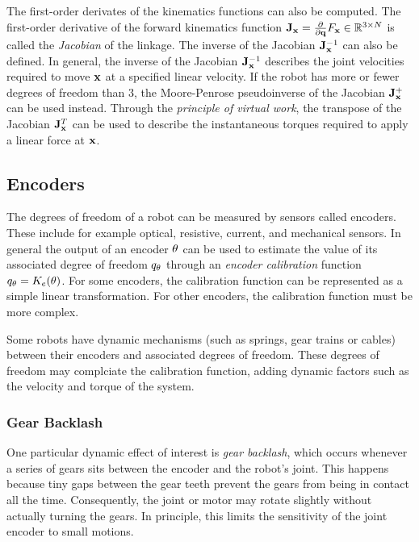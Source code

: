 The first-order derivates of the kinematics functions can also be computed. The first-order derivative of the forward kinematics function $\mathbf{J}_{\mathbf{x}} = \frac{\partial}{\partial \mathbf{q}} F_{\mathbf{x}} \in \mathbb{R}^{3 \times N}$ is called the \textit{Jacobian} of the linkage. The inverse of the Jacobian $\mathbf{J}_{\mathbf{x}}^{-1}$ can also be defined. In general, the inverse of the Jacobian $\mathbf{J}_{\mathbf{x}}^{-1}$ describes the joint velocities required to move $\mathbf{x}$ at a specified linear velocity. If the robot has more or fewer degrees of freedom than $3$, the Moore-Penrose pseudoinverse of the Jacobian $\mathbf{J}_{\mathbf{x}}^{+}$ can be used instead. Through the \textit{principle of virtual work}, the transpose of the Jacobian $\mathbf{J}_{\mathbf{x}}^{T}$ can be used to describe the instantaneous torques required to apply a linear force at $\mathbf{x}$.
  
\subsection{Encoders}
\label{sec:encoders}
The degrees of freedom of a robot can be measured by sensors called encoders. These include for example optical, resistive, current, and mechanical sensors. In general the output of an encoder $\theta$ can be used to estimate the value of its associated degree of freedom $q_\theta$ through an \textit{encoder calibration} function $q_\theta = K_e(\theta)$. For some encoders, the calibration function can be represented as a simple linear transformation. For other encoders, the calibration function must be more complex. 

Some robots have dynamic mechanisms (such as springs, gear trains or cables) between their encoders and associated degrees of freedom. These degrees of freedom may complciate the calibration function, adding dynamic factors such as the velocity and torque of the system.

\subsubsection{Gear Backlash}
\label{sec:encoders}
One particular dynamic effect of interest is \textit{gear backlash}, which occurs whenever a series of gears sits between the encoder and the robot's joint. This happens because tiny gaps between the gear teeth prevent the gears from being in contact all the time. Consequently, the joint or motor may rotate slightly without actually turning the gears. In principle, this limits the sensitivity of the joint encoder to small motions.

